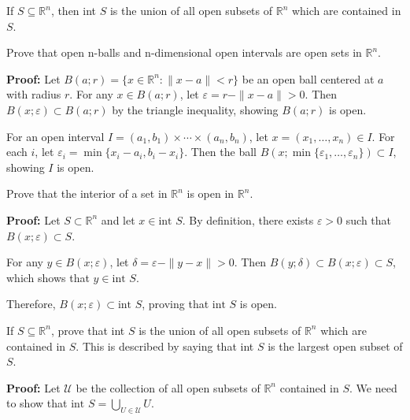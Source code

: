 \begin{theorem}
If $S \subseteq \mathbb{R}^n$, then int $S$ is the union of all open subsets of $\mathbb{R}^n$ which are contained in $S$.
\end{theorem}

\begin{problembox}
Prove that open n-balls and n-dimensional open intervals are open sets in $\mathbb{R}^n$.
\end{problembox}

\textbf{Proof:} Let $B(a;r) = \{x \in \mathbb{R}^n : \|x-a\| < r\}$ be an open ball centered at $a$ with radius $r$. For any $x \in B(a;r)$, let $\varepsilon = r - \|x-a\| > 0$. Then $B(x;\varepsilon) \subset B(a;r)$ by the triangle inequality, showing $B(a;r)$ is open.

For an open interval $I = (a_1,b_1) \times \cdots \times (a_n,b_n)$, let $x = (x_1,\ldots,x_n) \in I$. For each $i$, let $\varepsilon_i = \min\{x_i - a_i, b_i - x_i\}$. Then the ball $B(x;\min\{\varepsilon_1,\ldots,\varepsilon_n\}) \subset I$, showing $I$ is open.

\begin{problembox}
Prove that the interior of a set in $\mathbb{R}^n$ is open in $\mathbb{R}^n$.
\end{problembox}

\textbf{Proof:} Let $S \subset \mathbb{R}^n$ and let $x \in \text{int } S$. By definition, there exists $\varepsilon > 0$ such that $B(x;\varepsilon) \subset S$.

For any $y \in B(x;\varepsilon)$, let $\delta = \varepsilon - \|y-x\| > 0$. Then $B(y;\delta) \subset B(x;\varepsilon) \subset S$, which shows that $y \in \text{int } S$.

Therefore, $B(x;\varepsilon) \subset \text{int } S$, proving that $\text{int } S$ is open.

\begin{problembox}
If $S \subseteq \mathbb{R}^n$, prove that int $S$ is the union of all open subsets of $\mathbb{R}^n$ which are contained in $S$. This is described by saying that int $S$ is the largest open subset of $S$.
\end{problembox}

\textbf{Proof:} Let $\mathcal{U}$ be the collection of all open subsets of $\mathbb{R}^n$ contained in $S$. We need to show that $\text{int } S = \bigcup_{U \in \mathcal{U}} U$.

